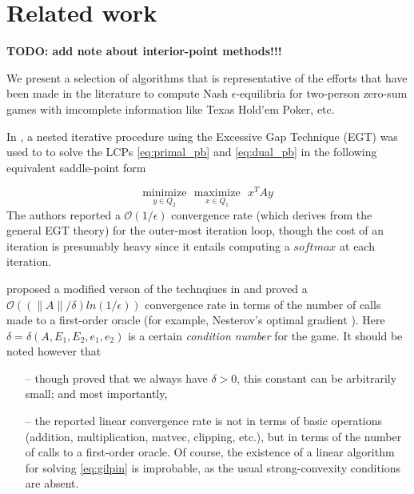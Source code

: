 \documentclass{article} %
\begin{document}
\section{Related work}
\label{sec:related_work}
\textbf{TODO: add note about interior-point methods!!!}

We present a selection of algorithms that is representative of the
efforts that have been made in the literature to compute Nash
$\epsilon$-equilibria for two-person zero-sum games with imcomplete
information like Texas Hold'em Poker, etc.


In \cite{hoda2010smoothing}, a nested iterative procedure using the
Excessive Gap Technique (EGT) \cite{nesterov2005excessive} was used to
to solve the LCPs \eqref{eq:primal_pb} and \eqref{eq:dual_pb} in the
following equivalent saddle-point form


\begin{equation}
  \underset{y \in Q_2}{\text{minimize}}\text{ }\underset{x \in
    Q_1}{\text{maximize}}\text{ }x^TAy
  \label{eq:gilpin}
\end{equation}
The authors reported a $\mathcal{O}(1/\epsilon)$ convergence rate
(which derives from the general EGT theory) for the outer-most
iteration loop, though the cost of an iteration is presumably heavy
since it entails computing a $softmax$ at each iteration.


\cite{gilpinfirst} proposed a modified verson of the technqiues in
\cite{hoda2010smoothing} and  proved a $\mathcal{O}\left(\left(\|A\| /
\delta\right) ln\left(1 / \epsilon\right)\right)$ convergence rate in
terms of the number of calls made to a first-order oracle (for
example, Nesterov's optimal gradient \cite{nesterov1983}). Here
$\delta = \delta(A, E_1, E_2, e_1, e_2)$ is a certain
\textit{condition number} for the game. It should be noted however that
\begin{itemize}
\item[--] though \cite{gilpinfirst} proved that we always have $\delta
  > 0$, this constant can be arbitrarily small; and most importantly,
\item[--] the reported linear convergence rate is not in terms of
  basic operations (addition, multiplication, matvec, clipping, etc.),
  but in terms of the number of calls to a first-order oracle. Of
  course, the existence of a linear algorithm for solving
  \eqref{eq:gilpin} is improbable, as the usual strong-convexity
  conditions are absent.

\end{itemize}
\end{document}
